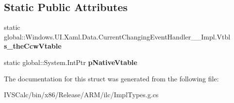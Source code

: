 \subsection*{Static Public Attributes}
\begin{DoxyCompactItemize}
\item 
\mbox{\label{struct_windows_1_1_u_i_1_1_xaml_1_1_data_1_1_current_changing_event_handler_____impl_1_1_vtbl_a5a39f0788b69cb9f7404304bf7657933}} 
static global\+::\+Windows.\+U\+I.\+Xaml.\+Data.\+Current\+Changing\+Event\+Handler\+\_\+\+\_\+\+Impl.\+Vtbl {\bfseries s\+\_\+the\+Ccw\+Vtable}
\item 
\mbox{\label{struct_windows_1_1_u_i_1_1_xaml_1_1_data_1_1_current_changing_event_handler_____impl_1_1_vtbl_a0fcc6c5a9097a5a1744e1decad66db28}} 
static global\+::\+System.\+Int\+Ptr {\bfseries p\+Native\+Vtable}
\end{DoxyCompactItemize}


The documentation for this struct was generated from the following file\+:\begin{DoxyCompactItemize}
\item 
I\+V\+S\+Calc/bin/x86/\+Release/\+A\+R\+M/ilc/Impl\+Types.\+g.\+cs\end{DoxyCompactItemize}
